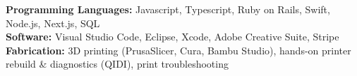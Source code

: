 \noindent
\textbf{Programming Languages:} Javascript, Typescript, Ruby on Rails, Swift, Node.js, Next.js, SQL \\
\textbf{Software:} Visual Studio Code, Eclipse, Xcode, Adobe Creative Suite, Stripe \\
\textbf{Fabrication:} 3D printing (PrusaSlicer, Cura, Bambu Studio), hands-on printer rebuild \& diagnostics (QIDI), print troubleshooting
